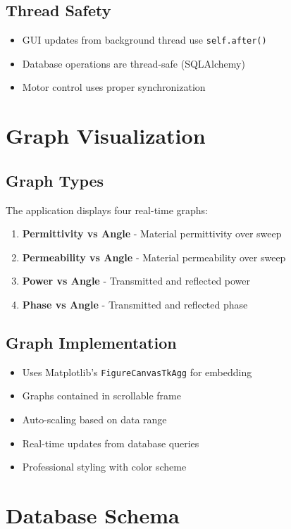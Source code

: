 \documentclass[11pt,a4paper]{article}
\begin{document}
\subsection{Thread Safety}
\begin{itemize}
    \item GUI updates from background thread use \texttt{self.after()}
    \item Database operations are thread-safe (SQLAlchemy)
    \item Motor control uses proper synchronization
\end{itemize}

\section{Graph Visualization}

\subsection{Graph Types}
The application displays four real-time graphs:
\begin{enumerate}
    \item \textbf{Permittivity vs Angle} - Material permittivity over sweep
    \item \textbf{Permeability vs Angle} - Material permeability over sweep
    \item \textbf{Power vs Angle} - Transmitted and reflected power
    \item \textbf{Phase vs Angle} - Transmitted and reflected phase
\end{enumerate}

\subsection{Graph Implementation}
\begin{itemize}
    \item Uses Matplotlib's \texttt{FigureCanvasTkAgg} for embedding
    \item Graphs contained in scrollable frame
    \item Auto-scaling based on data range
    \item Real-time updates from database queries
    \item Professional styling with color scheme
\end{itemize}

\section{Database Schema}
\end{document}
